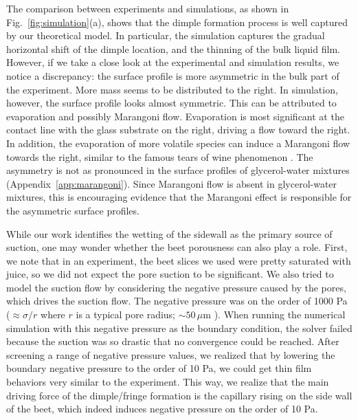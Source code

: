 \documentclass[aps,prfluids,amsmath,amssymb,superscriptaddress,longbibliography]{revtex4-2}
\newif\ifhighlight
\newcommand{\hl}[1]{\ifhighlight\textcolor{blue}{#1}\else#1\fi}
\begin{document}
The comparison between experiments and simulations, as shown in Fig.~\ref{fig:simulation}(a), shows that the dimple formation process is well captured by our theoretical model.
In particular, the simulation captures the gradual horizontal shift of the dimple location, and the thinning of the bulk liquid film.
However, if we take a close look at the experimental and simulation results, we notice a discrepancy: the surface profile is more asymmetric in the bulk part of the experiment.
More mass seems to be distributed to the right.
In simulation, however, the surface profile looks almost symmetric. 
This can be attributed to evaporation and possibly Marangoni flow.
Evaporation is most significant at the contact line with the glass substrate on the right, driving a flow toward the right.
In addition, the evaporation of more volatile species can induce a Marangoni flow towards the right, similar to the famous tears of wine phenomenon \cite{Thomson1855}.
\hl{The asymmetry is not as pronounced in the surface profiles of glycerol-water mixtures (Appendix~\ref{app:marangoni}).
Since Marangoni flow is absent in glycerol-water mixtures, this is encouraging evidence that the Marangoni effect is responsible for the asymmetric surface profiles.}

\hl{
While our work identifies the wetting of the sidewall as the primary source of suction, one may wonder whether the beet porousness can also play a role. 
First, we note that in an experiment, the beet slices we used were pretty saturated with juice, so we did not expect the pore suction to be significant. 
We also tried to model the suction flow by considering the negative pressure caused by the pores, which drives the suction flow. The negative pressure was on the order of 1000 Pa ($\approx \sigma /r$ where $r $ is a typical pore radius; $\sim 50 \,\mu\mathrm{m}$ \cite{beetpore}). 
When running the numerical simulation with this negative pressure as the boundary condition, the solver failed because the suction was so drastic that no convergence could be reached. 
After screening a range of negative pressure values, we realized that by lowering the boundary negative pressure to the order of 10 Pa, we could get thin film behaviors very similar to the experiment. 
This way, we realize that the main driving force of the dimple/fringe formation is the capillary rising on the side wall of the beet, which indeed induces negative pressure on the order of 10 Pa. 
}
\end{document}
